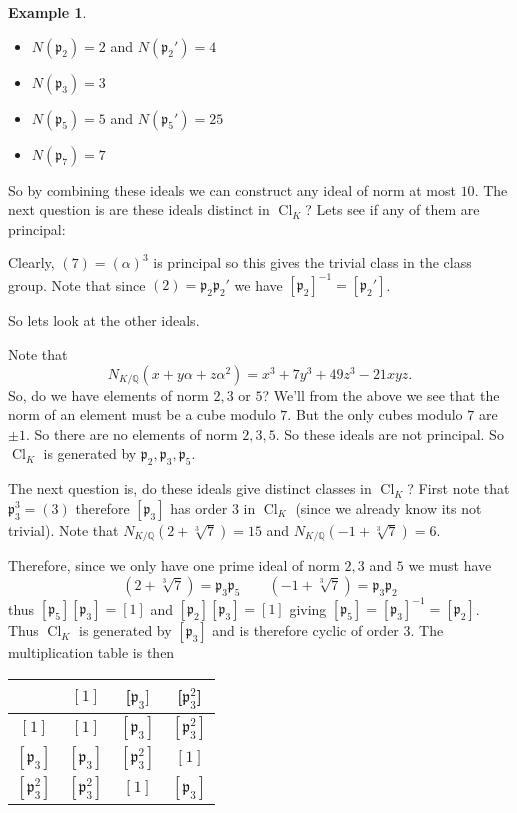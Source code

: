 \documentclass[11pt,a4paper]{report}
\theoremstyle{plain}
\theoremstyle{definition}
\newtheorem{exmp}[subsection]{Example}
\theoremstyle{definition}
\def\QQ{\mathbb{Q}}
\def\gothp{\mathfrak{p}}
\def \a{\alpha}
\DeclareMathOperator{\Cl}{Cl}
\begin{document}
\begin{exmp}
	\begin{itemize}
		\item $N(\gothp_2)=2$ and $N(\gothp_2')=4$
		\item $N(\gothp_3)=3$ 
		\item $N(\gothp_5)=5$ and $N(\gothp_5')=25$
		\item $N(\gothp_7)=7$
	\end{itemize}
	
	So by combining these ideals we can construct any ideal of norm at most $10$. The next question is are these ideals distinct in $\Cl_K$? Lets see if any of them are principal:
	
	Clearly, $(7)=(\a)^3$ is principal so this gives the trivial class in the class group. Note that since $(2)=\gothp_2\gothp_2'$ we have $[\gothp_2]^{-1}=[\gothp_2']$.
	
	So lets look at the other ideals.
	
	Note that \[N_{K/\QQ}(x+y\a+z\a^2)=x^3+7y^3+49z^3-21xyz.\] So, do we have elements of norm $2,3$ or $5$? We'll from the above we see that the norm of an element must be a cube modulo $7$. But the only cubes modulo $7$ are $\pm 1$. So there are no elements of norm $2,3,5$. So these ideals are not principal. So $\Cl_K$ is generated by $\gothp_{2},\gothp_3,\gothp_5$.
	
	The next question is, do these ideals give distinct classes in $\Cl_K$? First note that $\gothp_3^3=(3)$ therefore $[\gothp_3]$ has order $3$ in $\Cl_K$ (since we already know its not trivial). Note that $N_{K/\QQ}(2+\sqrt[3]{7})=15$ and $N_{K/\QQ}(-1+\sqrt[3]{7})=6$.
	
	Therefore, since we only have one prime ideal of norm $2,3$ and $5$ we must have \[(2+\sqrt[3]{7})=\gothp_3\gothp_5 \qquad (-1+\sqrt[3]{7})=\gothp_3\gothp_2 \] thus $[\gothp_5][\gothp_3]=[1]$ and $[\gothp_{2}][\gothp_3]=[1]$ giving $[\gothp_5]=[\gothp_3]^{-1}=[\gothp_2]$. Thus $\Cl_K$ is generated by $[\gothp_3]$ and is therefore cyclic of order $3$. The multiplication table is then
	
	
	\begin{center}
		\begin{tabular} {|c| c c c |}
			\hline
			&$[1]$&[$\gothp_3]$&[$\gothp_3^2$]\\
			\hline
			$[1]$&$[1]$&$[\gothp_3]$&$[\gothp_3^2]$\\
			$[\gothp_3]$&$[\gothp_3] $& $[\gothp_3^2]$&$[1]$\\
			$[\gothp_3^2]$&$[\gothp_3^2]$&$[1]$&$[\gothp_3]$\\
			\hline
		\end{tabular}
	\end{center}
	
	
\end{exmp}
\end{document}
